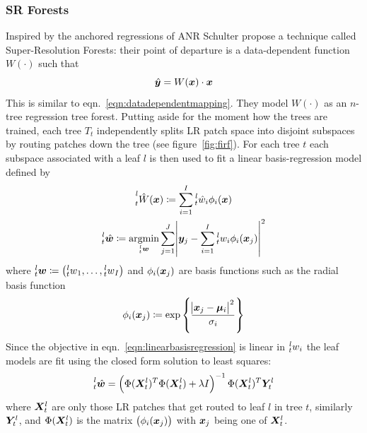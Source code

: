 \subsubsection{SR Forests}
Inspired by the anchored regressions of ANR Schulter \etal \cite{Schulter2015} propose a technique called Super-Resolution Forests: their point of departure is a data-dependent function \(W(\cdot)\) such that
\begin{equation}
    \hat{\bm{y}} = W(\bm{x}) \cdot \bm{x}
\end{equation}
This is similar to eqn.~\eqref{eqn:datadependentmapping}.
%
They model \(W(\cdot)\) as an \(n\)-tree regression tree forest.
%
Putting aside for the moment how the trees are trained, each tree \(T_t\) independently splits LR patch space into disjoint subspaces by routing patches down the tree (see figure~\ref{fig:firf}).
%
For each tree \(t\) each subspace associated with a leaf \(l\) is then used to fit a linear basis-regression model defined by
\begin{gather}
    \prescript{l}{t}{\hat{W}(\bm{x})} \coloneqq \sum_{i=1}^I \prescript{l}{t}{\hat{w}_i}\phi_i(\bm{x}) \\
    \prescript{l}{t}{\hat{\bm{w}}} \coloneqq \underset{\prescript{l}{t}{\bm{w}}}{\text{argmin}} \sum_{j=1}^J \abs{ \bm{y}_j - \sum_{i=1}^I \prescript{l}{t}{w_i}\phi_i(\bm{x}_j) }^2
    \label{eqn:linearbasisregression}
\end{gather}
where \(\prescript{l}{t}{\bm{w}} \coloneqq \left( \prescript{l}{t}{w}_1, \mathellipsis, \prescript{l}{t}{w}_I \right)\) and \(\phi_i(\bm{x}_j)\) are basis functions such as the radial basis function
\begin{equation}
    \phi_i(\bm{x}_j) \coloneqq \exp \left\{ \frac{\abs{ \bm{x}_j - \bm{\mu}_i }^2}{\sigma_i} \right\}
\end{equation}
Since the objective in eqn.~\eqref{eqn:linearbasisregression} is linear in \(\prescript{l}{t}{w}_i\) the leaf models are fit using the closed form solution to least squares:
\begin{equation}
    \prescript{l}{t}{\hat{\bm{w}}} = \left( \Phi(\bm{X}_t^l)^T \Phi(\bm{X}_t^l) + \lambda I \right)^{-1} \Phi(\bm{X}_t^l)^T \bm{Y}_t^l
\end{equation}
where \(\bm{X}_t^l\) are only those LR patches that get routed to leaf \(l\) in tree \(t\), similarly \(\bm{Y}_t^l\), and \(\Phi(\bm{X}_t^l)\) is the matrix \(\left( \phi_i(\bm{x}_j) \right)\) with \(\bm{x}_j\) being one of \(\bm{X}_t^l\).
%
